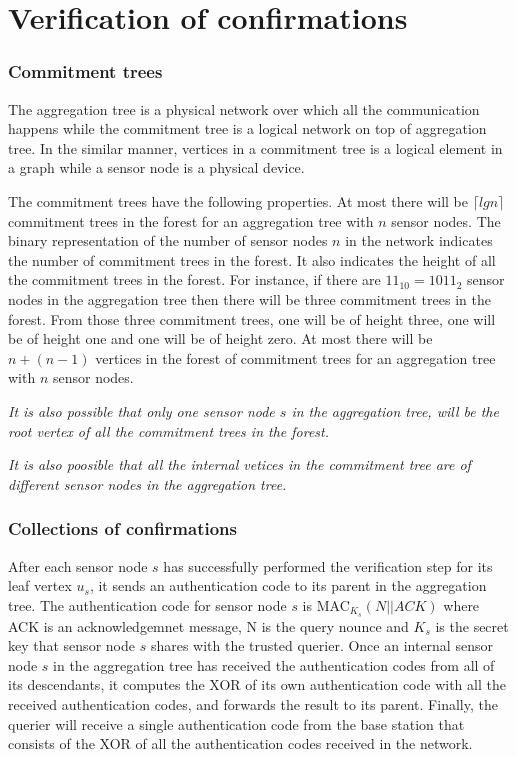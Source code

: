 \chapter{Verification of confirmations}

\subsection{Commitment trees} %
\label{sub:Commitment trees}
		
	The aggregation tree is a physical network over which all the
	communication happens while the commitment tree is a logical
	network on top of aggregation tree. In the similar manner, 
	vertices in a commitment tree is a logical element in a graph 
	while a sensor node is a physical device. 

	The commitment trees have the following properties. 
	At most there will be $\lceil lg  n \rceil$ commitment trees in the forest for an aggregation tree with $n$ sensor nodes.
	The binary representation of the number of sensor nodes $n$ in the network indicates the number of commitment trees in the forest. It also indicates the height of all the commitment trees in the forest. 
	For instance, if there are $ 11_{10} = 1011_{2} $ sensor nodes in the aggregation tree then there will be three commitment trees in the forest. From those three commitment trees, one will be of height three, one will be of height one and one will be of height zero.
	At most there will be $n + ( n - 1 )$ vertices in the forest of commitment trees for an aggregation tree with $n$ sensor 
	nodes.

	\textit{It is also possible that only one sensor node $s$ in the aggregation tree, will be the root vertex of all the commitment trees in the forest.} 

	\textit{It is also poosible that all the internal vetices in the commitment tree are of different sensor nodes in the aggregation tree.}



\subsection{Collections of confirmations}
After each sensor node $s$ has successfully performed the 
verification step for its leaf vertex $u_{s}$, it sends an 
authentication code to its parent in the aggregation tree.
The authentication code for sensor node $s$ is MAC$_{K_{s}}(N||ACK)$
where ACK is an acknowledgemnet message, N is the query nounce and $K_{s}$ 
is the secret key that sensor node $s$ shares with the trusted querier. Once
an internal sensor node $s$ in the aggregation tree has received the
authentication codes from all of its descendants, it computes the XOR of its 
own authentication code with all the received authentication codes, and 
forwards the result to its parent. Finally, the querier will receive a 
single authentication code from the base station that consists of the XOR of 
all the authentication codes received in the network. 

